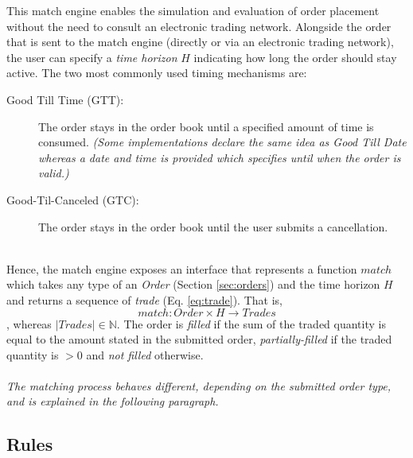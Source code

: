 This match engine enables the simulation and evaluation of order placement without the need to consult an electronic trading network.
Alongside the order that is sent to the match engine (directly or via an electronic trading network), the user can specify a \textit{time horizon} $H$ indicating how long the order should stay active.
The two most commonly used timing mechanisms are:
\begin{description}
    \item[Good Till Time (GTT): ] The order stays in the order book until a specified amount of time is consumed. \textit{(Some implementations declare the same idea as Good Till Date whereas a date and time is provided which specifies until when the order is valid.)}
    \item[Good-Til-Canceled (GTC): ] The order stays in the order book until the user submits a cancellation.
\end{description}
\hfill
\\
Hence, the match engine exposes an interface that represents a function $match$ which takes any type of an \textit{Order} (Section \ref{sec:orders}) and the time horizon $H$ and returns a sequence of \textit{trade} (Eq. \ref{eq:trade}).
That is,
\begin{equation}
    match : Order \times H \rightarrow Trades
\end{equation}
, whereas $|Trades| \in \mathbb{N}$.
The order is \textit{filled} if the sum of the traded quantity is equal to the amount stated in the submitted order, \textit{partially-filled} if the traded quantity is $> 0$ and \textit{not filled} otherwise.
\\
\\
\textit{The matching process behaves different, depending on the submitted order type, and is explained in the following paragraph.}

\subsection{Rules}

